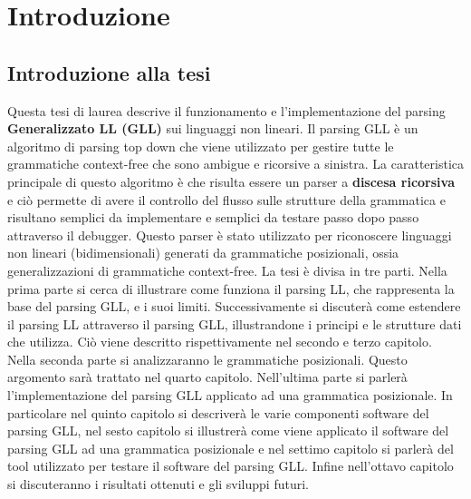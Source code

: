\chapter{Introduzione}
\section{Introduzione alla tesi}
Questa tesi di laurea descrive il funzionamento e l'implementazione del parsing \textbf{Generalizzato LL (GLL)} sui linguaggi non lineari. Il parsing GLL è un algoritmo di parsing top down che viene utilizzato per gestire tutte le grammatiche context-free che sono ambigue e ricorsive a sinistra. La caratteristica principale di questo algoritmo è che risulta essere un parser a \textbf{discesa ricorsiva} e ciò permette di avere il controllo del flusso sulle strutture della grammatica e risultano semplici da implementare e semplici da testare passo dopo passo attraverso il debugger. Questo parser è stato utilizzato per riconoscere linguaggi non lineari (bidimensionali) generati da grammatiche posizionali, ossia generalizzazioni di grammatiche context-free. La tesi è divisa in tre parti. Nella prima parte si cerca di illustrare come funziona il parsing LL, che rappresenta la base del parsing GLL, e i suoi limiti. Successivamente si  discuterà come estendere il parsing LL attraverso il parsing GLL, illustrandone i principi e le strutture dati che utilizza. Ciò viene descritto rispettivamente nel secondo e terzo capitolo. Nella seconda parte si analizzaranno le grammatiche posizionali. Questo argomento sarà trattato nel quarto capitolo. Nell'ultima parte si parlerà l'implementazione del parsing GLL applicato ad una grammatica posizionale. In particolare nel quinto capitolo si descriverà le varie  componenti software del parsing GLL, nel sesto capitolo si illustrerà come viene applicato il software del parsing GLL ad una grammatica posizionale e nel settimo capitolo si parlerà del tool utilizzato per testare il software del parsing GLL. Infine nell'ottavo capitolo si discuteranno i risultati ottenuti e gli sviluppi futuri.
